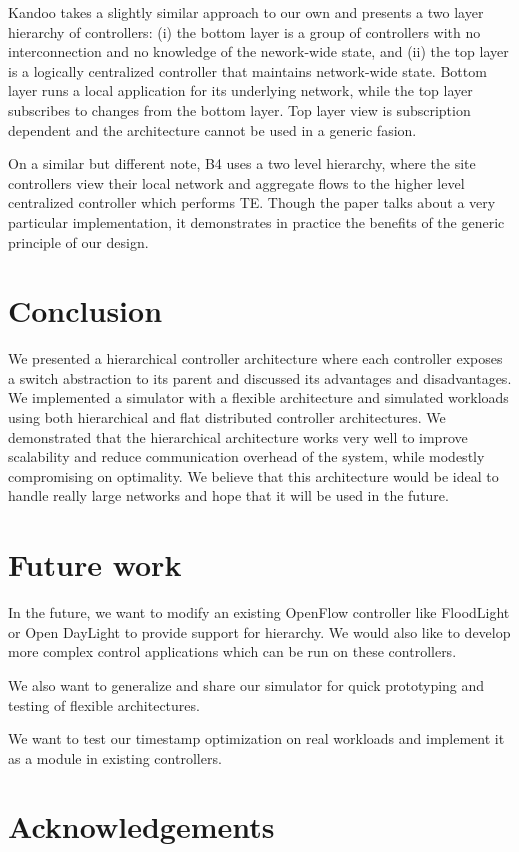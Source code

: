 \documentclass[10pt, twocolumn]{article}
\begin{document}
Kandoo\cite{kandoo} takes a slightly similar approach to our own and presents a two layer hierarchy of controllers: (i) the bottom layer is a group of controllers with no interconnection and no knowledge of the nework-wide state, and (ii) the top layer is a logically centralized controller that maintains network-wide state. Bottom layer runs a local application for its underlying network, while the top layer subscribes to changes from the bottom layer. Top layer view is subscription dependent and the architecture cannot be used in a generic fasion.

On a similar but different note, B4\cite{b4} uses a two level hierarchy, where the site controllers view their local network and aggregate flows to the higher level centralized controller which performs TE. Though the paper talks about a very particular implementation, it demonstrates in practice the benefits of the generic principle of our design.

\section{Conclusion}
\label{sec:conc}
We presented a hierarchical controller architecture where each controller exposes a switch abstraction to its parent and discussed its advantages and disadvantages. We implemented a simulator with a flexible architecture and simulated workloads using both hierarchical and flat distributed controller architectures. We demonstrated that the hierarchical architecture works very well to improve scalability and reduce communication overhead of the system, while modestly compromising on optimality. We believe that this architecture would be ideal to handle really large networks and hope that it will be used in the future.

\section{Future work}
\label{sec:future}
In the future, we want to modify an existing OpenFlow controller like FloodLight or Open DayLight to provide support for hierarchy. We would also like to develop more complex control applications which can be run on these controllers.

We also want to generalize and share our simulator for quick prototyping and testing of flexible architectures.

We want to test our timestamp optimization on real workloads and implement it as a module in existing controllers.

\section{Acknowledgements}
\label{sec:ack}
\nocite{*}



\end{document}
